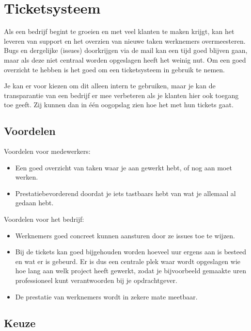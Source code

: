\section{Ticketsysteem}

Als een bedrijf begint te groeien en met veel klanten te maken krijgt, kan het leveren van support en het overzien van nieuwe taken werknemers overmeesteren. Bugs en dergelijke (issues) doorkrijgen via de mail kan een tijd goed blijven gaan, maar als deze niet centraal worden opgeslagen heeft het weinig nut. Om een goed overzicht te hebben is het goed om een ticketsysteem in gebruik te nemen.

Je kan er voor kiezen om dit alleen intern te gebruiken, maar je kan de transparantie van een bedrijf er mee verbeteren als je klanten hier ook toegang toe geeft. Zij kunnen dan in \'{e}\'{e}n oogopslag zien hoe het met hun tickets gaat.

\subsection{Voordelen}

Voordelen voor medewerkers:

\begin{itemize}
  \item Een goed overzicht van taken waar je aan gewerkt hebt, of nog aan moet werken.
  \item Prestatiebevorderend doordat je iets tastbaars hebt van wat je allemaal al gedaan hebt.
\end{itemize}

Voordelen voor het bedrijf:

\begin{itemize}
  \item Werknemers goed concreet kunnen aansturen door ze issues toe te wijzen.
  \item Bij de tickets kan goed bijgehouden worden hoeveel uur ergens aan is besteed en wat er is gebeurd. Er is dus een centrale plek waar wordt opgeslagen wie hoe lang aan welk project heeft gewerkt, zodat je bijvoorbeeld gemaakte uren professioneel kunt verantwoorden bij je opdrachtgever.
  \item De prestatie van werknemers wordt in zekere mate meetbaar.
\end{itemize}

\subsection{Keuze}

